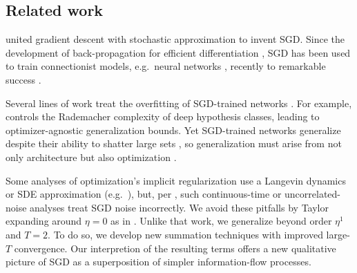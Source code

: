 \documentclass[anon,12pt]{colt2021} %
\begin{document}
        \subsection{Related work}\label{sect:related}
    

            \cite{ki52} united gradient descent \citep{ca47} with stochastic
            approximation \citep{ro51} to invent SGD.  Since the development of
            back-propagation for efficient differentiation \citep{we74}, SGD
            has been used to train connectionist models, e.g.\ neural networks
            \citep{bo91}, recently to remarkable success \citep{le15}.
        
        
            Several lines of work treat the overfitting of SGD-trained networks
            \citep{ne17a}.  For example, \cite{ba17} controls the Rademacher
            complexity of deep hypothesis classes, leading to
            optimizer-agnostic generalization bounds.  Yet SGD-trained networks
            generalize despite their ability to shatter large sets
            \citep{zh17}, so generalization must arise from not only
            architecture but also optimization \citep{ne17b}.  

            Some analyses of optimization's implicit regularization use a
            Langevin dynamics or SDE approximation (e.g.\ \cite{ch18,zh19}),
            but, per \cite{ya19a}, such continuous-time or uncorrelated-noise
            analyses treat SGD noise incorrectly.
            We avoid these pitfalls by Taylor expanding around $\eta=0$ as in
            \cite{ro18}.  Unlike that work, we generalize beyond order $\eta^1$
            and $T=2$.  To do so, we develop new summation techniques with
            improved large-$T$ convergence.  Our interpretion of the resulting
            terms offers a new qualitative picture of SGD as a superposition of
            simpler information-flow processes.
            
\end{document}
